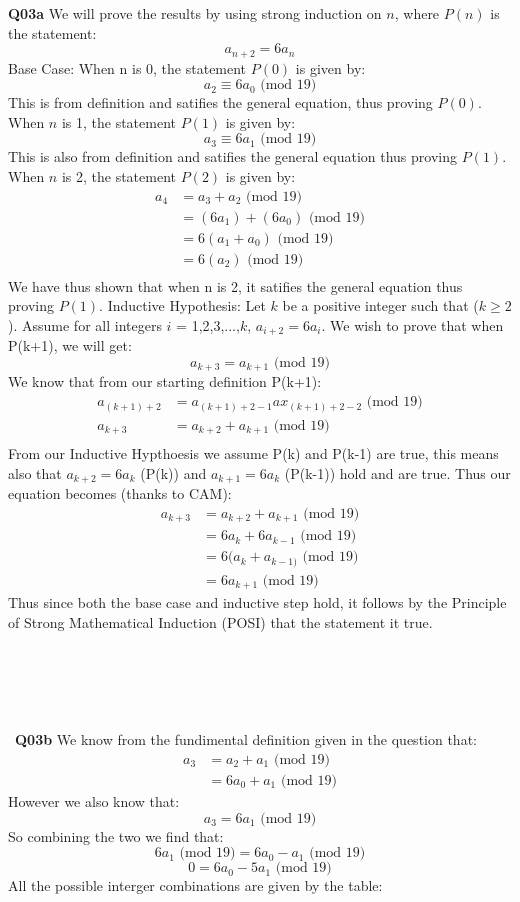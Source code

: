 \documentclass[11pt]{article}
\begin{document}
\parindent=0pt


\textbf{Q03a} We will prove the results by using strong induction on $n$, where $P(n)$ is the statement:
\[ a_{n+2} = 6a_{n} \]
Base Case: When n is $0$, the statement $P(0)$ is given by:
\[ a_2 \equiv 6a_0 \text{ (mod 19)} \]
This is from definition and satifies the general equation, thus proving $P(0)$.
When $n$ is 1, the statement $P(1)$ is given by:
\[ a_3 \equiv 6a_1 \text{ (mod 19)} \]
This is also from definition and satifies the general equation thus proving $P(1)$.
When $n$ is 2, the statement $P(2)$ is given by:
\begin{align*}
a_4 & = a_3 + a_2 \text{ (mod 19)} \\
& = (6a_1) + (6a_0) \text{ (mod 19)} \\
& =  6(a_1 + a_0) \text{ (mod 19)} \\
& =  6(a_2) \text{ (mod 19)} \\
\end{align*}
We have thus shown that when n is 2, it satifies the general equation thus proving $P(1)$.
Inductive Hypothesis: Let $k$ be a positive integer such that ($k \geq  2$). Assume for all integers $i$ = 1,2,3,...,$k$,  $a_{i+2} = 6 a_{i}$.
We wish to prove that when P(k+1), we will get:
\[ a_{k+3} = a_{k+1} \text{ (mod 19)} \]
We know that from our starting definition P(k+1):
\begin{align*}
a_{(k+1) + 2} & = a_{(k+1) + 2-1}  ax_{(k+1) + 2-2}  \text{ (mod 19)} \\
a_{k+3} & = a_{k+2}  +a_{k+1} \text{ (mod 19)} \\
\end{align*}
From our Inductive Hypthoesis we assume P(k) and P(k-1) are true, this means also that $a_{k+2} = 6a_k$ (P(k)) and $a_{k+1} = 6a_k$ (P(k-1)) hold and are true. Thus our equation becomes (thanks to CAM):
\begin{align*}
a_{k+3} &= a_{k+2}  +a_{k+1} \text{ (mod 19)} \\ 
 &= 6a_{k}  +6a_{k-1} \text{ (mod 19)} \\ 
 &= 6(a_{k}+a_{k-1)} \text{ (mod 19)} \\
&= 6a_{k+1} \text{ (mod 19)} 
\end{align*}
Thus since both the base case and inductive step hold, it follows by the Principle of Strong Mathematical Induction (POSI) that the statement it true.\\\\\\\\\\\\\
\textbf{Q03b} We know from the fundimental definition given in the question that:
\begin{align*}
a_{3} &= a_{2}  +a_{1} \text{ (mod 19)} \\ 
 &= 6a_0  +a_{1} \text{ (mod 19)} 
\end{align*}
However we also know that:
\[ a_{3}= 6a_{1} \text{ (mod 19)} \]
So combining the two we find that:
\[ 6a_{1} \text{ (mod 19)}  = 6a_0 - a_1 \text{ (mod 19)} \]
\[ 0 = 6a_0 - 5a_1 \text{ (mod 19)} \]
All the possible interger combinations are given by the table:
\end{document}
